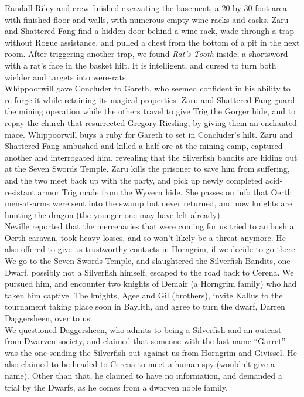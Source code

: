 \documentclass[letterpaper]{article}
\begin{document}
\noindent Randall Riley and crew finished excavating the basement, a 20 by 30 foot area with finished floor and walls, with numerous empty wine racks and casks.  Zaru and Shattered Fang find a hidden door behind a wine rack, wade through a trap without Rogue assistance, and pulled a chest from the bottom of a pit in the next room.  After triggering another trap, we found \emph{Rat's Tooth} inside, a shortsword with a rat's face in the basket hilt.  It is intelligent, and cursed to turn both wielder and targets into were-rats.  \\

\noindent Whippoorwill gave Concluder to Gareth, who seemed confident in his ability to re-forge it while retaining its magical properties. Zaru and Shattered Fang guard the mining operation while the others travel to give Trig the Gorger hide, and to repay the church that resurrected Gregory Riesling, by giving them an enchanted mace. Whippoorwill buys a ruby for Gareth to set in Concluder's hilt. Zaru and Shattered Fang ambushed and killed a half-orc at the mining camp, captured another and interrogated him, revealing that the Silverfish bandits are hiding out at the Seven Swords Temple. Zaru kills the prisoner to save him from suffering, and the two meet back up with the party, and pick up newly completed acid-resistant armor Trig made from the Wyvern hide.  She passes on info that Oerth men-at-arms were sent into the swamp but never returned, and now knights are hunting the dragon (the younger one may have left already).\\

\noindent Neville reported that the mercenaries that were coming for us tried to ambush a Oerth caravan, took heavy losses, and so won't likely be a threat anymore.  He also offered to give us trustworthy contacts in Horngrim, if we decide to go there.\\

\noindent We go to the Seven Swords Temple, and slaughtered the Silverfish Bandits, one Dwarf, possibly not a Silverfish himself, escaped to the road back to Cerena. We pursued him, and encounter two knights of Demair (a Horngrim family) who had taken him captive. The knights, Agee and Gil (brothers), invite Kallus to the tournament taking place soon in Baylith, and agree to turn the dwarf, Darren Daggersheen, over to us.\\

\noindent We questioned Daggersheen, who admits to being a Silverfish and an outcast from Dwarven society, and claimed that someone with the last name ``Garret'' was the one sending the Silverfish out against us from Horngrim and Givissel. He also claimed to be headed to Cerena to meet a human spy (wouldn't give a name).  Other than that, he claimed to have no information, and demanded a trial by the Dwarfs, as he comes from a dwarven noble family.\\
\end{document}
